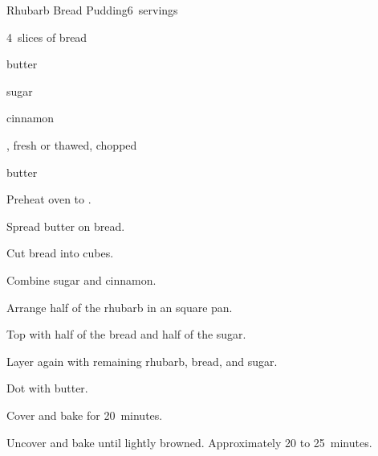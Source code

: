 \begin{recipe}{Rhubarb Bread Pudding}{}{6~servings}

\begin{ingredients}
\item 4~slices of bread
\item {} butter
\item {} sugar
\item \tp{\half} cinnamon
\item {} , fresh or thawed, chopped
\item \Tp{1\twothird} butter
\end{ingredients}

\begin{directions}
\item Preheat oven to .
\item Spread butter on bread.
\item Cut bread into \inch{\half} cubes.
\item Combine sugar and cinnamon.
\item Arrange half of the rhubarb in an  square pan.
\item Top with half of the bread and half of the sugar.
\item Layer again with remaining rhubarb, bread, and sugar.
\item Dot with butter.
\item Cover and bake for 20~minutes.
\item Uncover and bake until lightly browned. Approximately 20 to 25~minutes.
\end{directions}

\end{recipe}
